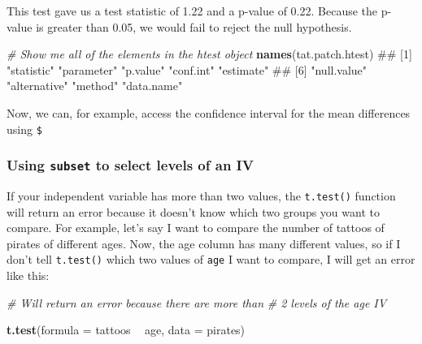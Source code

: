 \documentclass[]{book}
\newenvironment{Shaded}{\begin{snugshade}}{\end{snugshade}}
\newcommand{\KeywordTok}[1]{\textcolor[rgb]{0.13,0.29,0.53}{\textbf{#1}}}
\newcommand{\DataTypeTok}[1]{\textcolor[rgb]{0.13,0.29,0.53}{#1}}
\newcommand{\StringTok}[1]{\textcolor[rgb]{0.31,0.60,0.02}{#1}}
\newcommand{\CommentTok}[1]{\textcolor[rgb]{0.56,0.35,0.01}{\textit{#1}}}
\newcommand{\OperatorTok}[1]{\textcolor[rgb]{0.81,0.36,0.00}{\textbf{#1}}}
\newcommand{\NormalTok}[1]{#1}
\theoremstyle{definition}
\theoremstyle{definition}
\theoremstyle{remark}
\begin{document}
This test gave us a test statistic of 1.22 and a p-value of 0.22.
Because the p-value is greater than 0.05, we would fail to reject the
null hypothesis.

\begin{Shaded}
\begin{Highlighting}[]
\CommentTok{# Show me all of the elements in the htest object}
\KeywordTok{names}\NormalTok{(tat.patch.htest)}
\NormalTok{## [1] "statistic"   "parameter"   "p.value"     "conf.int"    "estimate"   }
\NormalTok{## [6] "null.value"  "alternative" "method"      "data.name"}
\end{Highlighting}
\end{Shaded}

Now, we can, for example, access the confidence interval for the mean
differences using \texttt{\$}

\begin{Shaded}
\end{Shaded}

\subsubsection{\texorpdfstring{Using \texttt{subset} to select levels of
an
IV}{Using subset to select levels of an IV}}\label{using-subset-to-select-levels-of-an-iv}

If your independent variable has more than two values, the
\texttt{t.test()} function will return an error because it doesn't know
which two groups you want to compare. For example, let's say I want to
compare the number of tattoos of pirates of different ages. Now, the age
column has many different values, so if I don't tell \texttt{t.test()}
which two values of \texttt{age} I want to compare, I will get an error
like this:

\begin{Shaded}
\begin{Highlighting}[]
\CommentTok{# Will return an error because there are more than}
\CommentTok{#  2 levels of the age IV}

\KeywordTok{t.test}\NormalTok{(}\DataTypeTok{formula =}\NormalTok{ tattoos }\OperatorTok{~}\StringTok{ }\NormalTok{age,}
       \DataTypeTok{data =}\NormalTok{ pirates)}
\end{Highlighting}
\end{Shaded}
\end{document}

